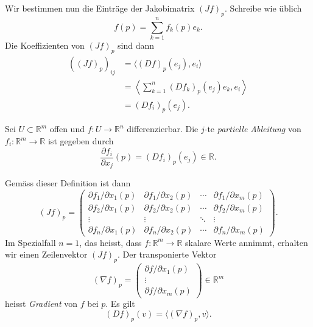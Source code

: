 \documentclass[../main.tex]{subfiles}
\begin{document}
Wir bestimmen nun die Einträge der Jakobimatrix
${(Jf)}_p$.
Schreibe wie üblich
\[
  f(p) = \sum_{k=1}^{n} f_k(p) e_k.
\]
Die Koeffizienten von ${(Jf)}_p$ sind dann
\begin{align*}
  {({(Jf)}_p)}_{ij} 
  &= \langle {(Df)}_p(e_j), e_i \rangle  \\
  &= \left\langle 
    \sum_{k=1}^{n} {(Df_k)}_p(e_j) e_k,
    e_i
  \right\rangle \\
  &= {(Df_i)}_p(e_j).
\end{align*}

\begin{definition}
  Sei $U \subset \mathbb{R}^m$ offen und
  $f \colon U \to \mathbb{R}^n$ differenzierbar.
  Die $j$-te \emph{partielle Ableitung}
  von $f_i \colon \mathbb{R}^m \to \mathbb{R}$ ist
  gegeben durch
  \[
    \frac{\partial f_i}{\partial x_j}(p) = {(Df_i)}_p(e_j) \in \mathbb{R}.
  \]
\end{definition}

Gemäss dieser Definition ist dann
\[
  {(Jf)}_p =
  \begin{pmatrix}
    {\partial f_1}/{\partial x_1}(p)
    & {\partial f_1}/{\partial x_2}(p)
    & \cdots
    &{\partial f_1}/{\partial x_m}(p)
    \\
    {\partial f_2}/{\partial x_1}(p)
    & {\partial f_2}/{\partial x_2}(p)
    & \cdots
    & {\partial f_2}/{\partial x_m}(p)\\
    \vdots & \vdots & \ddots & \vdots \\
    \partial f_n / \partial x_1 (p)
    & \partial f_n / \partial x_2 (p)
    & \cdots
    & \partial f_n / \partial x_m(p)
  \end{pmatrix}.
\]
Im Spezialfall $n = 1$, das heisst,
dass $f \colon \mathbb{R}^m \to \mathbb{R}$ 
skalare Werte annimmt, erhalten wir
einen Zeilenvektor ${(Jf)}_p$.
Der transponierte Vektor
 \[
   {(\nabla f)}_p =
   \begin{pmatrix}
     \partial f / \partial x_1 (p) \\
     \vdots \\
     \partial f/ \partial x_m (p)
   \end{pmatrix}
   \in \mathbb{R}^m
\]
heisst \emph{Gradient} von $f$ bei $p$.
Es gilt
\[
  {(Df)}_p(v) = \langle {(\nabla f)}_p, v \rangle.
\]
\end{document}
